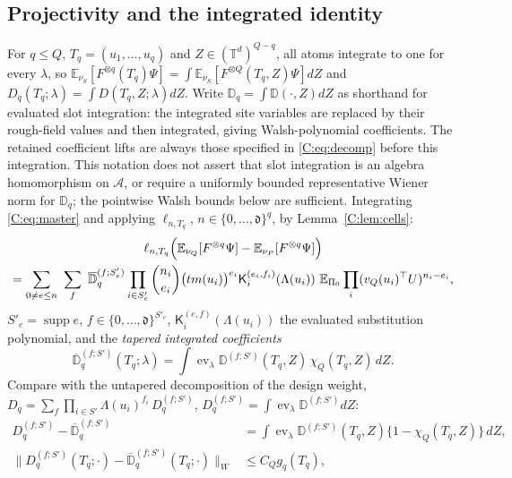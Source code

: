\documentclass[11pt]{article}
\DeclareMathOperator{\ev}{ev}
\newcommand{\E}{\mathbb{E}}
\newcommand{\Torus}{\mathbb{T}}
\newcommand{\cA}{\mathcal{A}}
\newcommand{\norm}[1]{\lVert #1\rVert}
\newcommand{\dg}{\mathfrak{d}}
\newcommand{\K}{\mathsf{K}}
\begin{document}
\subsection{Projectivity and the integrated identity}\label{C:sec:projectivity}
For \(q\le Q\), \(T_q=(u_1,\dots,u_q)\) and \(Z\in(\Torus^d)^{Q-q}\), all
atoms integrate to one for every \(\lambda\), so
\(\E_{\nu_S}[F^{\otimes q}(T_q)\Psi]=\int\E_{\nu_S}[F^{\otimes Q}(T_q,Z)\Psi]dZ\)
and \(D_q(T_q;\lambda)=\int D(T_q,Z;\lambda)dZ\).  Write
\(\mathbb D_q=\int\mathbb D(\cdot,Z)dZ\) as shorthand for evaluated
slot integration: the integrated site variables are replaced by their
rough-field values and then integrated, giving Walsh-polynomial
coefficients.  The retained coefficient lifts are always those
specified in \eqref{C:eq:decomp} before this integration.  This notation
does not assert that slot integration is an algebra homomorphism on
\(\cA\), or require a uniformly bounded representative Wiener norm for
\(\mathbb D_q\); the pointwise Walsh bounds below are sufficient.
Integrating
\eqref{C:eq:master} and applying \(\ell_{n,T_q}\), \(n\in\{0,\dots,\dg\}^q\), by
Lemma~\ref{C:lem:cells}:
\begin{multline}
 \ell_{n,T_q}\Bigl(\E_{\nu_Q}[F^{\otimes q}\Psi]-\E_{\nu_P}[F^{\otimes q}\Psi]\Bigr)\\
 =\sum_{0\ne e\le n}\ \sum_{f}\ \overline{\mathbb D}^{(f;S'_e)}_q
 \prod_{i\in S'_e}\binom{n_i}{e_i}\bigl(tm(u_i)\bigr)^{e_i}\K_i^{(e_i,f_i)}(\Lambda(u_i))
 \ \E_{\Pi_0}\prod_i(v_Q(u_i)^\top U)^{n_i-e_i},
 \label{C:eq:proj}
\end{multline}
\(S'_e=\operatorname{supp}e\), \(f\in\{0,\dots,\dg\}^{S'_e}\),
\(\K_i^{(e,f)}(\Lambda(u_i))\) the evaluated substitution polynomial, and
the \emph{tapered integrated coefficients}
\begin{equation}
 \overline{\mathbb D}^{(f;S')}_q(T_q;\lambda)=\int\ev_\lambda\mathbb D^{(f;S')}(T_q,Z)\,\chi_Q(T_q,Z)\,dZ .
 \label{C:eq:tapered}
\end{equation}
Compare with the untapered decomposition of the design weight,
\(D_q=\sum_{f}\prod_{i\in S'}\Lambda(u_i)^{f_i}\,D_q^{(f;S')}\),
\(D_q^{(f;S')}=\int\ev_\lambda\mathbb D^{(f;S')}dZ\):
\begin{equation}
 \begin{aligned}
 D^{(f;S')}_q-\overline{\mathbb D}^{(f;S')}_q
   &=\int\ev_\lambda\mathbb D^{(f;S')}(T_q,Z)
                 \{1-\chi_Q(T_q,Z)\}\,dZ,\\
 \norm{D^{(f;S')}_q(T_q;\cdot)
              -\overline{\mathbb D}^{(f;S')}_q(T_q;\cdot)}_W
   &\le C_Qg_q(T_q),
 \end{aligned}
 \label{C:eq:ghost-diff}
\end{equation}
\end{document}
